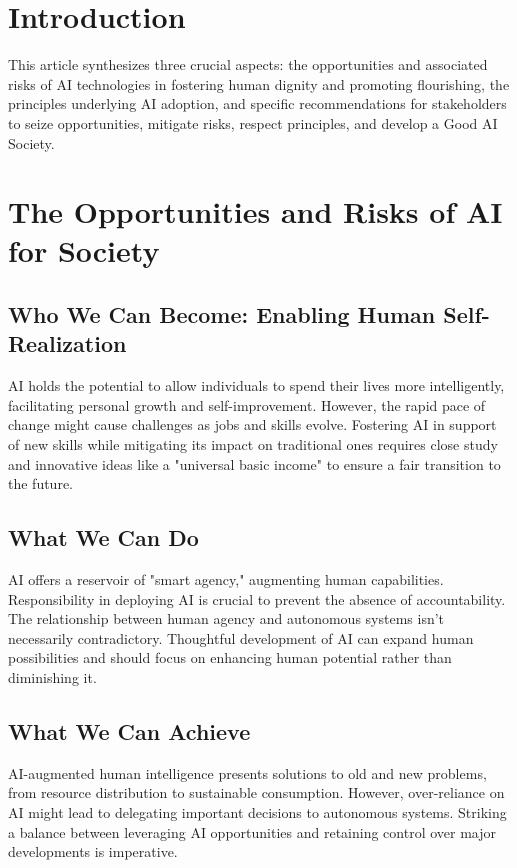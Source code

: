 \section{Introduction}
This article synthesizes three crucial aspects: the opportunities and associated risks of AI technologies in fostering human dignity and promoting flourishing, the principles underlying AI adoption, and specific recommendations for stakeholders to seize opportunities, mitigate risks, respect principles, and develop a Good AI Society.

\section{The Opportunities and Risks of AI for Society}

\subsection{Who We Can Become: Enabling Human Self-Realization}
AI holds the potential to allow individuals to spend their lives more intelligently, facilitating personal growth and self-improvement. However, the rapid pace of change might cause challenges as jobs and skills evolve. Fostering AI in support of new skills while mitigating its impact on traditional ones requires close study and innovative ideas like a "universal basic income" to ensure a fair transition to the future.

\subsection{What We Can Do}
AI offers a reservoir of "smart agency," augmenting human capabilities. Responsibility in deploying AI is crucial to prevent the absence of accountability. The relationship between human agency and autonomous systems isn't necessarily contradictory. Thoughtful development of AI can expand human possibilities and should focus on enhancing human potential rather than diminishing it.

\subsection{What We Can Achieve}
AI-augmented human intelligence presents solutions to old and new problems, from resource distribution to sustainable consumption. However, over-reliance on AI might lead to delegating important decisions to autonomous systems. Striking a balance between leveraging AI opportunities and retaining control over major developments is imperative.

